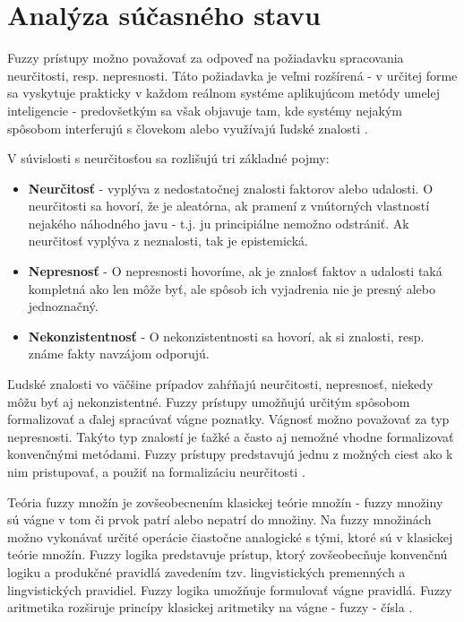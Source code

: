 \chapter{Analýza súčasného stavu}



Fuzzy prístupy možno považovať za odpoveď na požiadavku spracovania neurčitosti, resp. nepresnosti. Táto požiadavka je veľmi rozšírená - v určitej forme sa vyskytuje prakticky v každom reálnom systéme aplikujúcom metódy umelej inteligencie - predovšetkým sa však objavuje tam, kde systémy nejakým spôsobom interferujú s človekom alebo využívajú ľudské znalosti \cite{gregorUI} .

V súvislosti s neurčitosťou sa rozlišujú tri základné pojmy:   %
\begin{itemize}
	\item \textbf{Neurčitosť} - vyplýva z nedostatočnej znalosti faktorov alebo udalosti. O neurčitosti sa hovorí, že je aleatórna, ak pramení z vnútorných vlastností nejakého náhodného javu - t.j. ju principiálne nemožno odstrániť. Ak neurčitosť vyplýva z neznalosti, tak je epistemická. 
	\item \textbf{Nepresnosť} - O nepresnosti hovoríme, ak je znalosť faktov a udalosti taká kompletná ako len môže byť, ale spôsob ich vyjadrenia nie je presný alebo jednoznačný. 
	\item \textbf{Nekonzistentnosť} - O nekonzistentnosti sa hovorí, ak si znalosti, resp. známe fakty navzájom odporujú\cite{ gregorUI,gregorRef13}.
\end{itemize} 

Ľudské znalosti vo väčšine prípadov zahŕňajú neurčitosti, nepresnosť, niekedy môžu byť aj nekonzistentné. 
Fuzzy prístupy umožňujú určitým spôsobom formalizovať a ďalej spracúvať vágne poznatky. Vágnosť možno považovať za typ nepresnosti. 
Takýto typ znalostí je ťažké a často aj nemožné vhodne formalizovať konvenčnými metódami. Fuzzy prístupy predstavujú jednu z možných ciest ako k nim pristupovať, a použiť na formalizáciu neurčitosti \cite{gregorUI, gregorRef13}.

Teória fuzzy množín je zovšeobecnením klasickej teórie množín - fuzzy množiny sú vágne v tom či prvok patrí alebo nepatrí do množiny.  Na fuzzy množinách možno vykonávať určité operácie čiastočne analogické s tými, ktoré sú v klasickej teórie množín. Fuzzy logika predstavuje prístup, ktorý zovšeobecňuje konvenčnú logiku a produkčné pravidlá zavedením tzv. lingvistických premenných a lingvistických pravidiel. Fuzzy logika umožňuje formulovať vágne pravidlá. Fuzzy aritmetika rozširuje princípy klasickej aritmetiky na vágne - fuzzy - čísla \cite{gregorUI}. 


